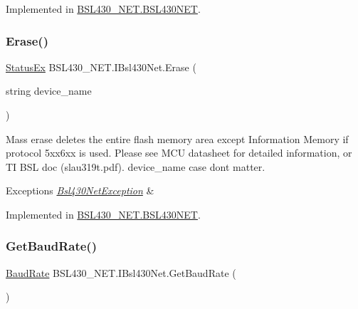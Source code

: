 Implemented in \mbox{\hyperlink{class_b_s_l430___n_e_t_1_1_b_s_l430_n_e_t_a355e17f3dd02eb96810a36661f8e4b8d}{B\+S\+L430\+\_\+\+N\+E\+T.\+B\+S\+L430\+N\+ET}}.

\mbox{\label{interface_b_s_l430___n_e_t_1_1_i_bsl430_net_a54980ac32c18ed1202db2c9ff4e38a7a}} 
\subsubsection{\texorpdfstring{Erase()}{Erase()}\hspace{0.1cm}{\footnotesize\ttfamily [2/2]}}
{\footnotesize\ttfamily \mbox{\hyperlink{class_b_s_l430___n_e_t_1_1_status_ex}{Status\+Ex}} B\+S\+L430\+\_\+\+N\+E\+T.\+I\+Bsl430\+Net.\+Erase (\begin{DoxyParamCaption}\item[{string}]{device\+\_\+name }\end{DoxyParamCaption})}



Mass erase deletes the entire flash memory area except Information Memory if protocol 5xx6xx is used. Please see M\+CU datasheet for detailed information, or TI B\+SL doc (slau319t.\+pdf). device\+\_\+name case dont matter. 


\begin{DoxyExceptions}{Exceptions}
{\em \mbox{\hyperlink{class_b_s_l430___n_e_t_1_1_bsl430_net_exception}{Bsl430\+Net\+Exception}}} & \\
\hline
\end{DoxyExceptions}


Implemented in \mbox{\hyperlink{class_b_s_l430___n_e_t_1_1_b_s_l430_n_e_t_a994ac47f526248a23eeb108d38404366}{B\+S\+L430\+\_\+\+N\+E\+T.\+B\+S\+L430\+N\+ET}}.

\mbox{\label{interface_b_s_l430___n_e_t_1_1_i_bsl430_net_a96d263e6860582cd135b5d5ac90d792a}} 
\subsubsection{\texorpdfstring{GetBaudRate()}{GetBaudRate()}}
{\footnotesize\ttfamily \mbox{\hyperlink{namespace_b_s_l430___n_e_t_a8d30c263598635a481840944d38aeb70}{Baud\+Rate}} B\+S\+L430\+\_\+\+N\+E\+T.\+I\+Bsl430\+Net.\+Get\+Baud\+Rate (\begin{DoxyParamCaption}{ }\end{DoxyParamCaption})}



